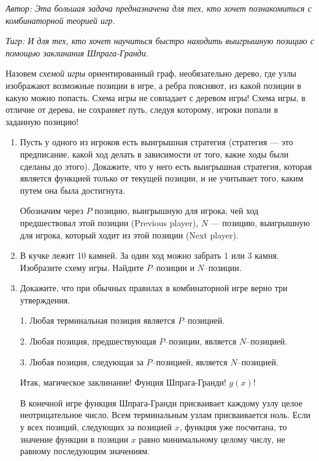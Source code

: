 \begin{problem}

{\it Автор: Эта большая задача предназначена для тех, кто хочет познакомиться с комбинаторной теорией игр. }\par
{\it Тигр: И для тех, кто хочет научиться быстро находить выигрышную позицию с помощью заклинания Шпрага-Гранди.}\par
Назовем {\it схемой игры} ориентированный граф, необязательно дерево, где узлы изображают возможные позиции в игре, а ребра поясняют, из какой позиции в какую можно попасть. Схема игры не совпадает с деревом игры! Схема игры, в отличие от дерева, не сохраняет путь, следуя которому, игроки попали в заданную позицию!
\begin{enumerate}
\item 	Пусть у одного из игроков есть выигрышная стратегия (стратегия — это предписание, какой ход делать в зависимости от того, какие ходы были сделаны до этого). Докажите, что у него есть выигрышная стратегия, которая является функцией только от текущей позиции, и не учитывает того, каким путем она была достигнута. \par
Обозначим через $P$ позицию, выигрышную для игрока, чей ход предшествовал этой позиции (Previous player), $N$ — позицию, выигрышную для игрока, который ходит из этой позиции (Next player).\par
\item\label{p:ShG2}	В кучке лежит 10 камней. За один ход можно забрать 1 или 3 камня. Изобразите схему игры. Найдите  $P$--позиции и  $N$--позиции.\par
\item \label{p:ShG3}	Докажите, что при обычных правилах в комбинаторной игре верно три утверждения. \par
1. Любая терминальная позиция является  $P$--позицией. \par
2. Любая позиция, предшествующая  $P$--позиции, является  $N$--позицией. \par
3. Любая позиция, следующая за  $P$--позицией, является  $N$--позицией.\par
Итак, магическое заклинание! Фунция Шпрага-Гранди!  $g\left(x\right)$!\par
В конечной игре функция Шпрага-Гранди присваивает каждому узлу целое неотрицательное число.
Всем терминальным узлам присваивается ноль.
Если у всех позиций, следующих за позицией  $x$, функция уже посчитана, то значение функции в позиции  $x$  равно минимальному целому числу, не равному последующим значениям.

\end{enumerate}
\end{problem}
